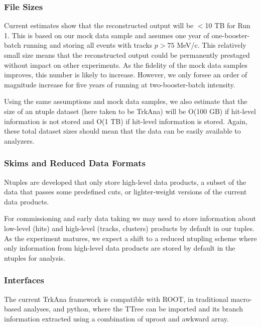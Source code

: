 \subsubsection{File Sizes}

Current estimates show that the reconstructed output will be $<$10 TB for Run 1. This is based on our mock data sample and assumes one year of one-booster-batch running and storing all events with tracks $p>75$ MeV/c. This relatively small size means that the reconstructed output could be permanently prestaged without impact on other experiments. As the fidelity of the mock data samples improves, this number is likely to increase. However, we only forsee an order of magnitude increase for five years of running at two-booster-batch intensity.

Using the same assumptions and mock data samples, we also estimate that the size of an ntuple dataset (here taken to be TrkAna) will be O(100 GB) if hit-level information is not stored and O(1 TB) if hit-level information is stored. Again, these total dataset sizes should mean that the data can be easily available to analyzers. 


\subsubsection{Skims and Reduced Data Formats}

Ntuples are developed that only store high-level data products, a subset of the data that passes some predefined cuts, or lighter-weight versions of the current data products.

For commissioning and early data taking we may need to store information about low-level (hits) and high-level (tracks, clusters) products by default in our tuples. As the experiment matures, we expect a shift to a reduced ntupling scheme where only information from high-level data products are stored by default in the ntuples for analysis.


\subsubsection{Interfaces}

The current TrkAna framework is compatible with ROOT, in traditional macro-based analyses, and python, where the TTree can be imported and its branch information extracted using a combination of uproot and awkward array. 

